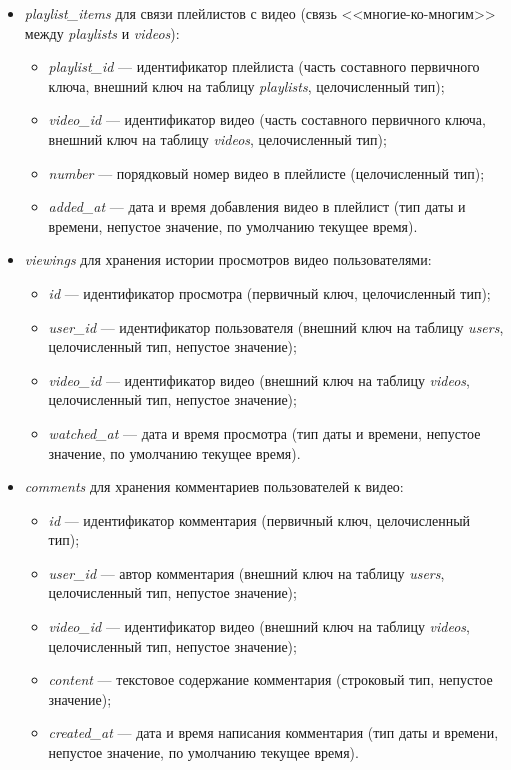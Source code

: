 \begin{itemize}
    \item \textit{playlist\_items} для связи плейлистов с видео (связь <<многие-ко-многим>> между \textit{playlists} и \textit{videos}):
    \begin{itemize}
        \item \textit{playlist\_id} --- идентификатор плейлиста (часть составного первичного ключа, внешний ключ на таблицу \textit{playlists}, целочисленный тип);
        \item \textit{video\_id} --- идентификатор видео (часть составного первичного ключа, внешний ключ на таблицу \textit{videos}, целочисленный тип);
        \item \textit{number} --- порядковый номер видео в плейлисте (целочисленный тип);
        \item \textit{added\_at} --- дата и время добавления видео в плейлист (тип даты и времени, непустое значение, по умолчанию текущее время).
    \end{itemize}

    \item \textit{viewings} для хранения истории просмотров видео пользователями:
    \begin{itemize}
        \item \textit{id} --- идентификатор просмотра (первичный ключ, целочисленный тип);
        \item \textit{user\_id} --- идентификатор пользователя (внешний ключ на таблицу \textit{users}, целочисленный тип, непустое значение);
        \item \textit{video\_id} --- идентификатор видео (внешний ключ на таблицу \textit{videos}, целочисленный тип, непустое значение);
        \item \textit{watched\_at} --- дата и время просмотра (тип даты и времени, непустое значение, по умолчанию текущее время).
    \end{itemize}

    \item \textit{comments} для хранения комментариев пользователей к видео:
    \begin{itemize}
        \item \textit{id} --- идентификатор комментария (первичный ключ, целочисленный тип);
        \item \textit{user\_id} --- автор комментария (внешний ключ на таблицу \textit{users}, целочисленный тип, непустое значение);
        \item \textit{video\_id} --- идентификатор видео (внешний ключ на таблицу \textit{videos}, целочисленный тип, непустое значение);
        \item \textit{content} --- текстовое содержание комментария (строковый тип, непустое значение);
        \item \textit{created\_at} --- дата и время написания комментария (тип даты и времени, непустое значение, по умолчанию текущее время).
    \end{itemize}


\end{itemize}
